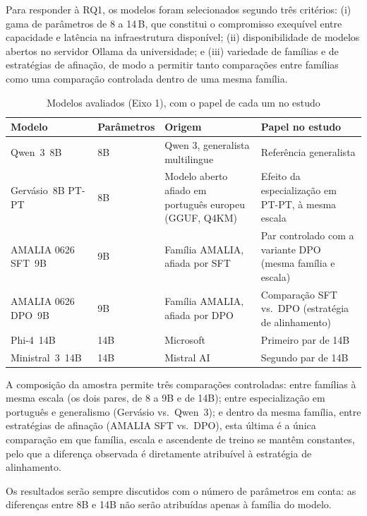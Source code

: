 \documentclass[11pt]{article}
\renewcommand{\_}{\textunderscore\allowbreak}
\begin{document}
Para responder à RQ1, os modelos foram selecionados segundo três critérios: (i) gama de parâmetros de 8 a 14\,B, que constitui o compromisso exequível entre capacidade e latência na infraestrutura disponível; (ii) disponibilidade de modelos abertos no servidor Ollama da universidade; e (iii) variedade de famílias e de estratégias de afinação, de modo a permitir tanto comparações entre famílias como uma comparação controlada dentro de uma mesma família.

\begin{table}[h!]
\centering
\caption{Modelos avaliados (Eixo 1), com o papel de cada um no estudo}
\label{tab:modelos}
\begin{tabular}{>{\raggedright\arraybackslash}p{3.3cm}>{\raggedright\arraybackslash}p{1.9cm}>{\raggedright\arraybackslash}p{4.9cm}>{\raggedright\arraybackslash}p{4.1cm}}
\toprule
\textbf{Modelo} & \textbf{Parâmetros} & \textbf{Origem} & \textbf{Papel no estudo} \\ \midrule
Qwen~3~8B & 8B & Qwen 3, generalista multilingue & Referência generalista \cite{qwen3} \\ \midrule
Gervásio~8B PT-PT & 8B & Modelo aberto afiado em português europeu (GGUF, Q4\_K\_M) & Efeito da especialização em PT-PT, à mesma escala \\ \midrule
AMALIA 0626 SFT~9B & 9B & Família AMALIA, afiada por SFT & Par controlado com a variante DPO (mesma família e escala) \\ \midrule
AMALIA 0626 DPO~9B & 9B & Família AMALIA, afiada por DPO & Comparação SFT vs.\ DPO (estratégia de alinhamento) \\ \midrule
Phi-4~14B & 14B & Microsoft & Primeiro par de 14B \\ \midrule
Ministral~3~14B & 14B & Mistral AI & Segundo par de 14B \\ \bottomrule
\end{tabular}
\end{table}

A composição da amostra permite três comparações controladas: entre famílias à mesma escala (os dois pares, de 8 a 9B e de 14B); entre especialização em português e generalismo (Gervásio vs.\ Qwen~3); e dentro da mesma família, entre estratégias de afinação (AMALIA SFT vs.\ DPO), esta última é a única comparação em que família, escala e ascendente de treino se mantêm constantes, pelo que a diferença observada é diretamente atribuível à estratégia de alinhamento.

Os resultados serão sempre discutidos com o número de parâmetros em conta: as diferenças entre 8B e 14B não serão atribuídas apenas à família do modelo. 
\end{document}
